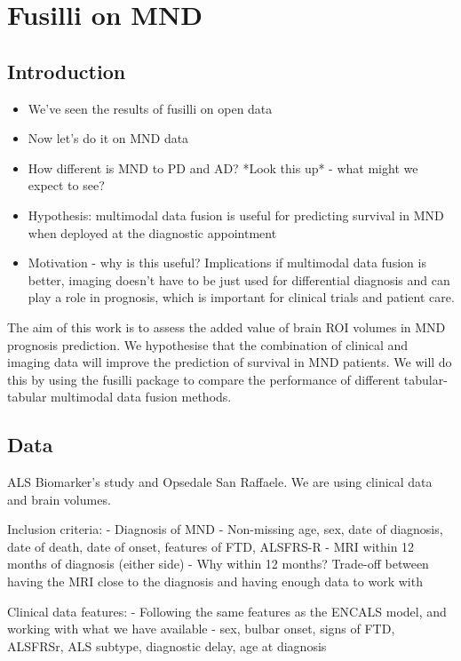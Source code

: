 \chapter{Fusilli on MND}
\label{fusilli_on_mnd}

\section{Introduction}
\begin{itemize}
    \item We've seen the results of fusilli on open data
    \item Now let's do it on MND data
    \item How different is MND to PD and AD? *Look this up* - what might we expect to see?
    \item Hypothesis: multimodal data fusion is useful for predicting survival in MND when deployed at the diagnostic appointment
    \item Motivation - why is this useful? Implications if multimodal data fusion is better, imaging doesn't have to be just used for differential diagnosis and can play a role in prognosis, which is important for clinical trials and patient care.
\end{itemize}

The aim of this work is to assess the added value of brain ROI volumes in MND prognosis prediction.
We hypothesise that the combination of clinical and imaging data will improve the prediction of survival in MND patients.
We will do this by using the fusilli package to compare the performance of different tabular-tabular multimodal data fusion methods.

\section{Data}

ALS Biomarker's study and Opsedale San Raffaele.
We are using clinical data and brain volumes.

Inclusion criteria:
- Diagnosis of MND
- Non-missing age, sex, date of diagnosis, date of death, date of onset, features of FTD, ALSFRS-R
- MRI within 12 months of diagnosis (either side)
    - Why within 12 months? Trade-off between having the MRI close to the diagnosis and having enough data to work with

Clinical data features:
- Following the same features as the ENCALS model, and working with what we have available
- sex, bulbar onset, signs of FTD, ALSFRSr, ALS subtype, diagnostic delay, age at diagnosis

